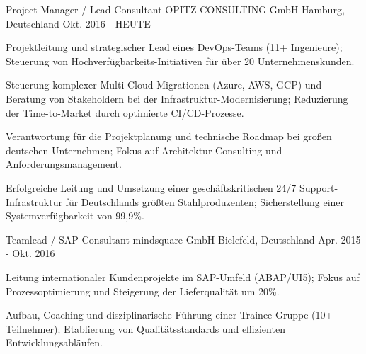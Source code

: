 

\begin{cventries}

  \cventry
    {Project Manager / Lead Consultant} %
    {OPITZ CONSULTING GmbH} %
    {Hamburg, Deutschland} %
    {Okt. 2016 - HEUTE} %
    {
      \begin{cvitems}
        \item {Projektleitung und strategischer Lead eines DevOps-Teams (11+ Ingenieure); Steuerung von Hochverfügbarkeits-Initiativen für über 20 Unternehmenskunden.}
        \item {Steuerung komplexer Multi-Cloud-Migrationen (Azure, AWS, GCP) und Beratung von Stakeholdern bei der Infrastruktur-Modernisierung; Reduzierung der Time-to-Market durch optimierte CI/CD-Prozesse.}
        \item {Verantwortung für die Projektplanung und technische Roadmap bei großen deutschen Unternehmen; Fokus auf Architektur-Consulting und Anforderungsmanagement.}
        \item {Erfolgreiche Leitung und Umsetzung einer geschäftskritischen 24/7 Support-Infrastruktur für Deutschlands größten Stahlproduzenten; Sicherstellung einer Systemverfügbarkeit von 99,9\%.}
      \end{cvitems}
    }

\vspace{2mm}
\cventry
{Teamlead / SAP Consultant} %
{mindsquare GmbH} %
{Bielefeld, Deutschland} %
{Apr. 2015 - Okt. 2016} %
{
  \begin{cvitems}
    \item {Leitung internationaler Kundenprojekte im SAP-Umfeld (ABAP/UI5); Fokus auf Prozessoptimierung und Steigerung der Lieferqualität um 20\%.}
    \item {Aufbau, Coaching und disziplinarische Führung einer Trainee-Gruppe (10+ Teilnehmer); Etablierung von Qualitätsstandards und effizienten Entwicklungsabläufen.}
  \end{cvitems}
}


\end{cventries}
